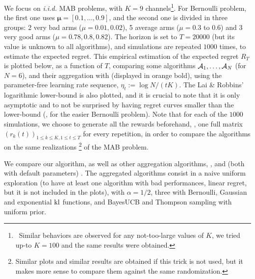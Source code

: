
We focus on \emph{i.i.d.} MAB problems, with $K = 9$ channels\footnote{~Similar behaviors are observed for any not-too-large values of $K$, we tried up-to $K = 100$ and the same results were obtained.}.
For Bernoulli problem, the first one uses $\boldsymbol{\mu}=[0.1,\dots,0.9]$,
and the second one is divided in three groups:
2 very bad arms ($\mu = 0.01, 0.02$), 5 average arms ($\mu = 0.3$ to $0.6$) and 3 very good arms ($\mu = 0.78, 0.8, 0.82$).
The horizon is set to $T = 20000$ (but its value is unknown to all algorithms), and simulations are repeated $1000$ times, to estimate the expected regret.
%
This empirical estimation of the expected regret $R_T$ is plotted below, as a function of $T$, comparing some algorithms $\mathcal{A}_1,\dots,\mathcal{A}_N$ (for $N=6$), and their aggregation with \Aggr{} (displayed in orange bold),
using the parameter-free learning rate sequence, $\eta_t := \log{N} / (t K)$.
The Lai \& Robbins' logarithmic lower-bound \cite{LaiRobbins85} is also plotted, and it is crucial to note that it is only asymptotic and to not be surprised by having regret curves smaller than the lower-bound (\eg, for the easier Bernoulli problem).
%
Note that for each of the $1000$ simulations, we choose to generate all the rewards beforehand, \ie, one full matrix $(r_k(t))_{1\leq k \leq K, 1 \leq t \leq T}$ for every repetition, in order to compare the algorithms on the same realizations%
\footnote{Similar plots and similar results are obtained if this trick is not used, but it makes more sense to compare them against the same randomization.}
of the MAB problem.

We compare our \Aggr{} algorithm,
as well as other aggregation algorithms, \ExpQ{},
\CORRAL{} and \LearnExp{} (both with default parameters) \cite{Bubeck12,Agarwal16,Singla17}.
The aggregated algorithms consist in a naive uniform exploration (to have at least one algorithm with bad performances, \ie{} linear regret, but it is not included in the plots),
\UCB{} with $\alpha=1/2$, three \klUCB{} with Bernoulli, Gaussian and exponential $\mathrm{kl}$ functions, and BayesUCB and Thompson sampling with uniform prior.

